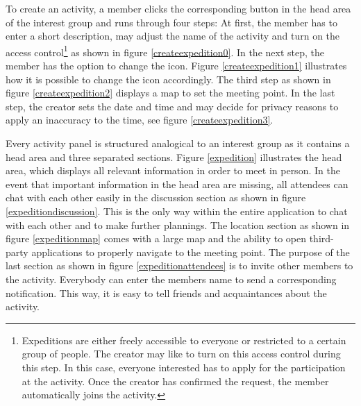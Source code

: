 \documentclass[12pt,numbers=noenddot,parskip,bibliography=totocnumbered,listof=totocnumbered,draft]{scrreprt}
\begin{document}
To create an activity, a member clicks the corresponding button in the head area of the interest group and runs through four steps: At first, the member has to enter a short description, may adjust the name of the activity and turn on the access control\footnote{Expeditions are either freely accessible to everyone or restricted to a certain group of people. The creator may like to turn on this access control during this step. In this case, everyone interested has to apply for the participation at the activity. Once the creator has confirmed the request, the member automatically joins the activity.} as shown in figure \ref{createexpedition0}. In the next step, the member has the option to change the icon. Figure \ref{createexpedition1} illustrates how it is possible to change the icon accordingly. The third step as shown in figure \ref{createexpedition2} displays a map to set the meeting point. In the last step, the creator sets the date and time and may decide for privacy reasons to apply an inaccuracy to the time, see figure \ref{createexpedition3}.

Every activity panel is structured analogical to an interest group as it contains a head area and three separated sections. Figure \ref{expedition} illustrates the head area, which displays all relevant information in order to meet in person. In the event that important information in the head area are missing, all attendees can chat with each other easily in the discussion section as shown in figure \ref{expeditiondiscussion}. This is the only way within the entire application to chat with each other and to make further plannings. The location section as shown in figure \ref{expeditionmap} comes with a large map and the ability to open third-party applications to properly navigate to the meeting point. The purpose of the last section as shown in figure \ref{expeditionattendees} is to invite other members to the activity. Everybody can enter the members name to send a corresponding notification. This way, it is easy to tell friends and acquaintances about the activity.
\end{document}
